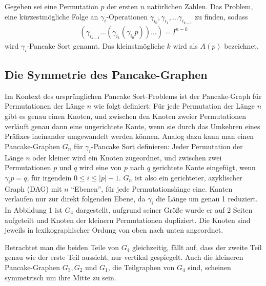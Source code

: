 \documentclass[a4paper, 10pt, ngerman]{article}
\begin{document}
\begin{definition}
    Gegeben sei eine Permutation $p$ der ersten $n$ natürlichen Zahlen. Das Problem, eine kürzestmögliche Folge an $\gamma_i$-Operationen $\gamma_{i_0}, \gamma_{i_1}, \dots \gamma_{i_{k-1}}$ zu finden, sodass
    \begin{align*}
        (\gamma_{i_{k-1}} \dots (\gamma_{i_1} (\gamma_{i_0} p)) \dots) = I^{n - k}
    \end{align*}
    wird $\gamma_i$-Pancake Sort genannt. Das kleinstmögliche $k$ wird als $A(p)$ bezeichnet.
\end{definition}

\subsection{Die Symmetrie des Pancake-Graphen}

Im Kontext des ursprünglichen Pancake Sort-Problems ist der Pancake-Graph für Permutationen der Länge $n$ wie folgt definiert: Für jede Permutation der Länge $n$ gibt es genau einen Knoten, und zwischen den Knoten zweier Permutationen verläuft genau dann eine ungerichtete Kante, wenn sie durch das Umkehren eines Präfixes ineinander umgewandelt werden können. Analog dazu kann man einen Pancake-Graphen $G_n$ für $\gamma_i$-Pancake Sort definieren: Jeder Permutation der Länge $n$ oder kleiner wird ein Knoten zugeordnet, und zwischen zwei Permutationen $p$ und $q$ wird eine von $p$ nach $q$ gerichtete Kante eingefügt, wenn $\gamma_i p = q$, für irgendein $0 \le i \le |p|-1$. $G_n$ ist also ein gerichteter, azyklischer Graph (DAG) mit $n$ ``Ebenen'', für jede Permutationslänge eine. Kanten verlaufen nur zur direkt folgenden Ebene, da $\gamma_i$ die Länge um genau 1 reduziert. In Abbildung 1 ist $G_4$ dargestellt, aufgrund seiner Größe wurde er auf 2 Seiten aufgeteilt und Knoten der kleinern Permutationen dupliziert. Die Knoten sind jeweils in lexikographischer Ordung von oben nach unten angeordnet.

Betrachtet man die beiden Teile von $G_4$ gleichzeitig, fällt auf, dass der zweite Teil genau wie der erste Teil aussieht, nur vertikal gespiegelt. Auch die kleineren Pancake-Graphen $G_3, G_2$ und $G_1$, die Teilgraphen von $G_4$ sind, scheinen symmetrisch um ihre Mitte zu sein.
\end{document}
